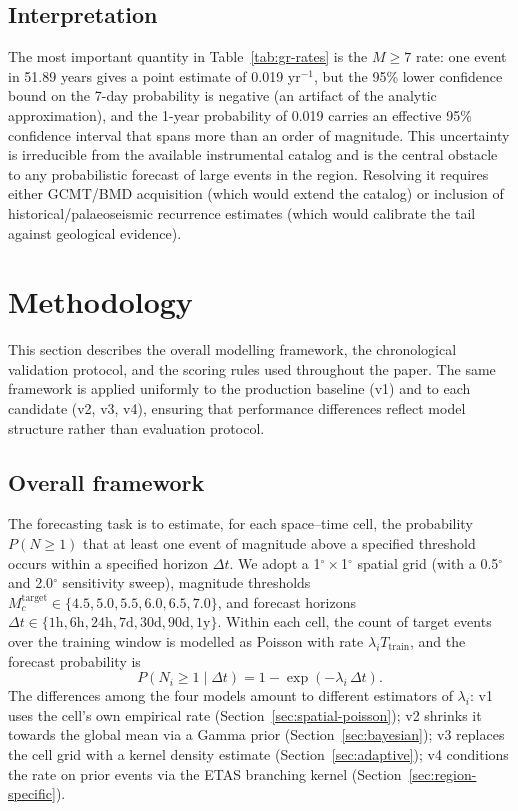 \documentclass[10pt,a4paper,twocolumn]{article}
\begin{document}
\subsection{Interpretation}

The most important quantity in Table~\ref{tab:gr-rates} is the $M\geq7$ rate: one event in 51.89 years gives a point estimate of 0.019 yr$^{-1}$, but the 95\% lower confidence bound on the 7-day probability is negative (an artifact of the analytic approximation), and the 1-year probability of 0.019 carries an effective 95\% confidence interval that spans more than an order of magnitude. This uncertainty is irreducible from the available instrumental catalog and is the central obstacle to any probabilistic forecast of large events in the region. Resolving it requires either GCMT/BMD acquisition (which would extend the catalog) or inclusion of historical/palaeoseismic recurrence estimates (which would calibrate the tail against geological evidence).

\section{Methodology}\label{sec:methodology}

This section describes the overall modelling framework, the chronological validation protocol, and the scoring rules used throughout the paper. The same framework is applied uniformly to the production baseline (v1) and to each candidate (v2, v3, v4), ensuring that performance differences reflect model structure rather than evaluation protocol.

\subsection{Overall framework}

The forecasting task is to estimate, for each space--time cell, the probability $P(N\geq1)$ that at least one event of magnitude above a specified threshold occurs within a specified horizon $\Delta t$. We adopt a 1$^\circ\times$1$^\circ$ spatial grid (with a 0.5$^\circ$ and 2.0$^\circ$ sensitivity sweep), magnitude thresholds $M_c^{\text{target}}\in\{4.5, 5.0, 5.5, 6.0, 6.5, 7.0\}$, and forecast horizons $\Delta t\in\{1\text{h}, 6\text{h}, 24\text{h}, 7\text{d}, 30\text{d}, 90\text{d}, 1\text{y}\}$. Within each cell, the count of target events over the training window is modelled as Poisson with rate $\lambda_i T_{\text{train}}$, and the forecast probability is
\[
P(N_i \geq 1 \mid \Delta t) = 1 - \exp\!\left(-\lambda_i \, \Delta t\right).
\]
The differences among the four models amount to different estimators of $\lambda_i$: v1 uses the cell's own empirical rate (Section~\ref{sec:spatial-poisson}); v2 shrinks it towards the global mean via a Gamma prior (Section~\ref{sec:bayesian}); v3 replaces the cell grid with a kernel density estimate (Section~\ref{sec:adaptive}); v4 conditions the rate on prior events via the ETAS branching kernel (Section~\ref{sec:region-specific}).
\end{document}
